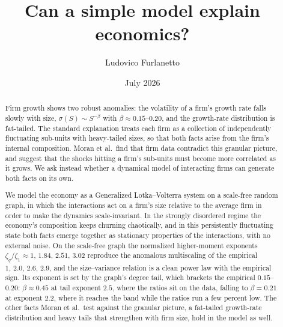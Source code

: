 \documentclass[12pt]{article}
\title{Can a simple model explain economics?}
\author{Ludovico Furlanetto}
\date{July 2026}
\begin{document}
\maketitle

\begin{abstract}
Firm growth shows two robust anomalies: the volatility of a firm's growth rate falls
slowly with size, $\sigma(S)\sim S^{-\beta}$
with $\beta\approx0.15$--$0.20$, and the growth-rate distribution is
fat-tailed. The standard explanation treats each firm as a collection of independently fluctuating
sub-units with heavy-tailed sizes, so that both facts arise from the firm's internal
composition. Moran et al.\ find that firm data contradict this granular picture, and suggest
that the shocks hitting a firm's sub-units must become more correlated as it
grows. We ask instead
whether a dynamical model of interacting firms can generate both facts on its own.

We model the economy as a Generalized Lotka--Volterra system on a scale-free random graph, in
which the interactions act on a firm's size relative to the average firm in order to
make the dynamics scale-invariant. In the strongly disordered
regime the economy's composition keeps churning chaotically, and in this persistently
fluctuating state both facts emerge together as stationary properties of the
interactions, with no external noise. On the scale-free graph the normalized higher-moment
exponents $\zeta_q/\zeta_1\approx1,\,1.84,\,2.51,\,3.02$ reproduce the anomalous multiscaling
of the empirical $1,\,2.0,\,2.6,\,2.9$, and the size--variance relation is a clean power law
with the empirical sign. Its exponent is set by the graph's degree tail, which brackets the
empirical $0.15$--$0.20$: $\beta \approx 0.45$ at tail exponent $2.5$, where the ratios sit
on the data, falling to $\beta = 0.21$ at exponent $2.2$, where it reaches the band while the
ratios run a few percent low. The other facts Moran et al.\ test against the
granular picture, a fat-tailed growth-rate distribution and heavy tails that strengthen
with firm size, hold in the model as well.
\end{abstract}
\end{document}
